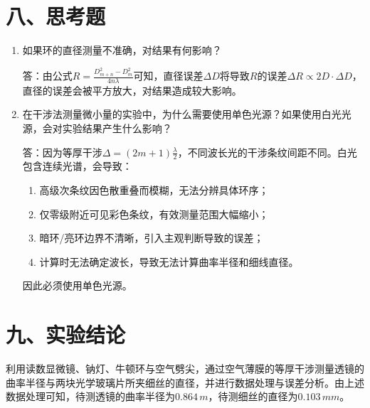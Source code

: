 \documentclass[11pt]{article}
\begin{document}
\section*{八、思考题}

\begin{enumerate}
    \item 如果环的直径测量不准确，对结果有何影响？
    
    答：由公式$R=\frac{D_{m+n}^2-D_m^2}{4n\lambda}$可知，直径误差$\Delta D$将导致$R$的误差$\Delta R \propto 2D\cdot\Delta D$，直径的误差会被平方放大，对结果造成较大影响。

    \item 在干涉法测量微小量的实验中，为什么需要使用单色光源？如果使用白光光源，会对实验结果产生什么影响？
    
    答：因为等厚干涉$\Delta = (2m+1)\frac{\lambda}{2}$，不同波长光的干涉条纹间距不同。白光包含连续光谱，会导致：
    \begin{enumerate}
        \item 高级次条纹因色散重叠而模糊，无法分辨具体环序；
        \item 仅零级附近可见彩色条纹，有效测量范围大幅缩小；
        \item 暗环/亮环边界不清晰，引入主观判断导致的误差；
        \item 计算时无法确定波长，导致无法计算曲率半径和细线直径。
    \end{enumerate}
    因此必须使用单色光源。
\end{enumerate}

\section*{九、实验结论}

利用读数显微镜、钠灯、牛顿环与空气劈尖，通过空气薄膜的等厚干涉测量透镜的曲率半径与两块光学玻璃片所夹细丝的直径，并进行数据处理与误差分析。由上述数据处理可知，待测透镜的曲率半径为$0.864\,m$，待测细丝的直径为$0.103\,mm$。
\end{document}
